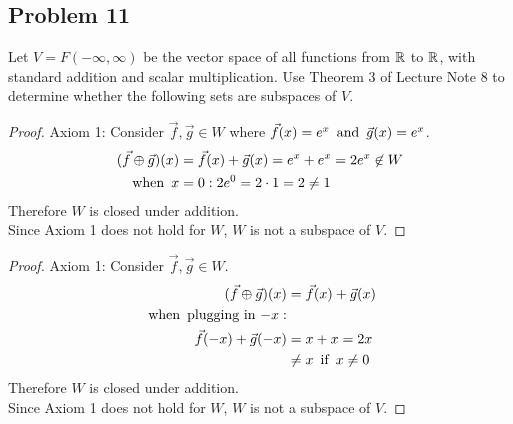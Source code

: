 \documentclass{article}
\begin{document}
\subsection*{Problem 11}
Let $V = F(-\infty, \infty)$ be the vector space of all functions from $\mathbb{R}$ to $\mathbb{R}$, with standard addition and scalar multiplication. Use Theorem 3 of Lecture Note 8 to determine whether the following sets are subspaces of $V$.
\begin{enumerate}
    \begin{proof}
        Axiom 1: Consider $\vec{f},\vec{g} \in W$ where $\vec{f}(x) = e^x \operatorname{~\text{and}~} \vec{g}(x) = e^x$.
        \begin{align*}
            (\vec{f} \oplus \vec{g})(x) & = \vec{f}(x) + \vec{g}(x) = e^x + e^x = 2e^x \not \in W \\
            \operatorname{~\text{when}~} x                    & = 0: 2e^0 = 2 \cdot 1 = 2 \neq 1
        \end{align*}
        Therefore $W$ is  closed under addition. \\
        Since Axiom 1 does not hold for $W$, $W$ is not a subspace of $V$.
    \end{proof}
    \begin{proof}
        Axiom 1: Consider $\vec{f}, \vec{g} \in W$.
        \begin{align*}
            (\vec{f} \oplus \vec{g})(x) & = \vec{f}(x) + \vec{g}(x) \\
            \operatorname{~\text{when}~} \text{plugging in $-x$}:                         \\
            \vec{f}(-x) + \vec{g}(-x)   & = x + x = 2x              \\
                                        & \neq x \operatorname{~\text{if}~} x \neq 0
        \end{align*}
        Therefore $W$ is  closed under addition. \\
        Since Axiom 1 does not hold for $W$, $W$ is not a subspace of $V$.
    \end{proof}
\end{enumerate}
\end{document}
